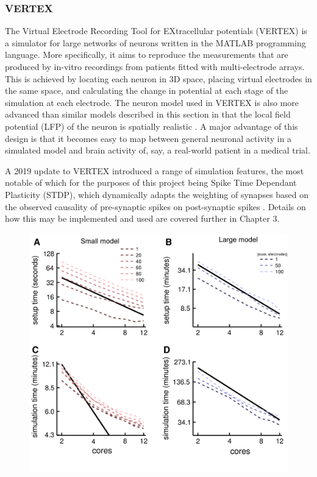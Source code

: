 \subsubsection{VERTEX}
The Virtual Electrode Recording Tool for EXtracellular potentials (VERTEX) is a
simulator for large networks of neurons written in the MATLAB programming
language. More specifically, it aims to reproduce the measurements that are
produced by in-vitro recordings from patients fitted with multi-electrode
arrays. This is achieved by locating each neuron in 3D space, placing virtual
electrodes in the same space, and calculating the change in potential at each
stage of the simulation at each electrode. The neuron model used in VERTEX is
also more advanced than similar models described in this section in that the
local field potential (LFP) of the neuron is spatially realistic \autocite{tomsett_virtual_2015}. A major
advantage of this design is that it becomes easy to map between general neuronal
activity in a simulated model and brain activity of, say, a real-world patient
in a medical trial. 

A 2019 update to VERTEX introduced a range of simulation features, the most
notable of which for the purposes of this project being Spike Time Dependant
Plasticity (STDP), which dynamically adapts the weighting of synapses based on
the observed causality of pre-synaptic spikes on post-synaptic spikes \autocite{thornton_virtual_2019}. Details
on how this may be implemented and used are covered further in Chapter 3.

\begin{figure}[h]
    \centering
    \includegraphics{figures/graphs/coresVERTEX.png}
    {\cite{tomsett_virtual_2015}}
    \label{VERTEXparallel}
\end{figure}
\vspace{1ex}

